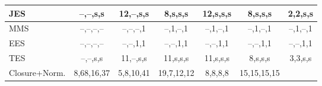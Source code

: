 \begin{table}[ht]
\begin{tabular}{|l|c|c|c|c|c|c|}
   \hline JES             & --,--,s,s   & 12,--,s,s   & 8,s,s,s     & 12,s,s,s    & 8,s,s,s     & 2,2,s,s     \\
   \hline MMS             & --,--,--,-- & --,--,--,1  & --,1,--,1   & --,1,--,1   & --,1,--,1   & --,1,--,1   \\
   \hline EES             & --,--,--,-- & --,--,1,1   & --,--,1,1   & --,--,1,1   & --,--,1,1   & --,--,1,1   \\
   \hline TES             & --,--,s,s   & 11,--,s,s   & 11,s,s,s    & 11,s,s,s    & 8,s,s,s     & 3,3,s,s     \\
   \hline Closure+Norm.   & 8,68,16,37  & 5,8,10,41   & 19,7,12,12  & 8,8,8,8     & 15,15,15,15 &             \\
   \hline \hline
 \end{tabular}
 \label{table:SystematicsTable}
\end{table}

